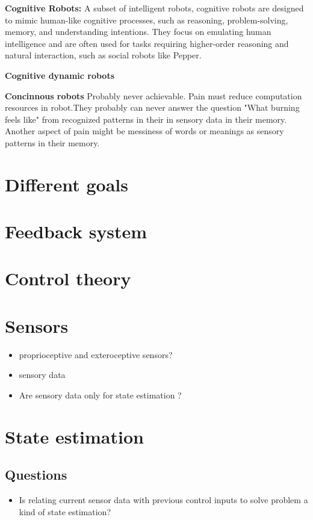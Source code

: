        \textbf{Cognitive Robots:} A subset of intelligent robots, cognitive robots are designed to mimic human-like cognitive processes, such as reasoning, problem-solving, memory, and understanding intentions. They focus on emulating human intelligence and are often used for tasks requiring higher-order reasoning and natural interaction, such as social robots like Pepper. 

        \textbf{Cognitive dynamic robots}

        \textbf{Concinnous robots}
        Probably never achievable. Pain must reduce computation resources in robot.They probably can never answer the question "What burning feels like" from recognized patterns in their in sensory data in their memory. Another aspect of pain might be messiness of words or meanings as sensory patterns in their memory.



\section{Different goals}
\section{Feedback system}

\section{Control theory}

\section{Sensors}
    \begin{itemize}
        \item proprioceptive and exteroceptive sensors?
        \item sensory data
        \item Are sensory data only for state estimation ?
    \end{itemize}

\section{State estimation}
    \subsection{Questions}
        \begin{itemize}
            \item Is relating current sensor data with previous control inputs to solve problem a kind of state estimation?
        \end{itemize}

